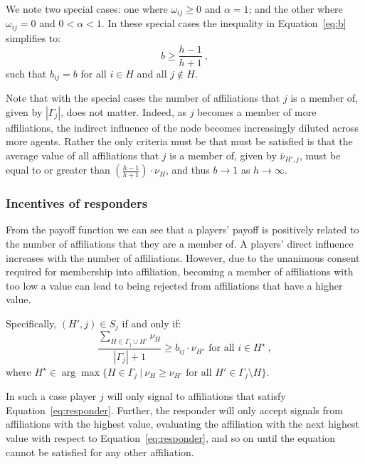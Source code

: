 \documentclass[11pt,fleqn]{article}
\begin{document}
We note two special cases: one where $\omega_{ij} \geqslant 0$ and $\alpha = 1$; and the other where $\omega_{ij} = 0$ and $0 < \alpha < 1$. In these special cases the inequality in Equation~\ref{eq:b} simplifies to:
\begin{equation}
b \geqslant \frac{h - 1}{h + 1} ~ ,
\end{equation}
such that $b_{ij} = b$ for all $i \in H$ and all $j \notin H$.

Note that with the special cases the number of affiliations that $j$ is a member of, given by $| \Gamma_{j} |$, does not matter. Indeed, as $j$ becomes a member of more affiliations, the indirect influence of the node becomes increasingly diluted across more agents. Rather the only criteria must be that must be satisfied is that the average value of all affiliations that $j$ is a member of, given by $\overline{\nu}_{H',j}$, must be equal to or greater than $\left( \frac{h - 1}{h + 1} \right) \cdot \nu_{H}$, and thus $b \rightarrow 1$ as $h \rightarrow \infty$.

\subsubsection*{Incentives of responders}

From the payoff function we can see that a players' payoff is positively related to the number of affiliations that they are a member of. A players' direct influence increases with the number of affiliations. However, due to the unanimous consent required for membership into affiliation, becoming a member of affiliations with too low a value can lead to being rejected from affiliations that have a higher value.

Specifically, $(H',j) \in S_{j}$ if and only if:
\begin{equation} \label{eq:responder}
\frac{\sum_{H \in \Gamma_{j} \cup H'} \nu_{H}}{| \Gamma_{j} | + 1} \geqslant b_{ij} \cdot \nu_{H^{\star}} \mbox{ for all } i \in H^{\star} ~ ,
\end{equation}
where $H^{\star} \in \arg\max\{H \in \Gamma_{j} ~ | ~ \nu_{H} \geqslant \nu_{H'} \mbox{ for all } H' \in \Gamma_{j} \setminus H \}$.

In such a case player $j$ will only signal to affiliations that satisfy Equation~\ref{eq:responder}. Further, the responder will only accept signals from affiliations with the highest value, evaluating the affiliation with the next highest value with respect to Equation~\ref{eq:responder}, and so on until the equation cannot be satisfied for any other affiliation.
\end{document}
